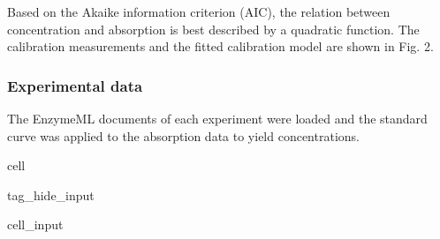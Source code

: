 \documentclass[letterpaper,12pt,english]{jupyterBook}
\begin{document}
\sphinxAtStartPar
Based on the Akaike information criterion (AIC), the relation between concentration and absorption is best described by a quadratic function. The calibration measurements and the fitted calibration model are shown in Fig. 2.


\subsubsection{Experimental data}
\label{\detokenize{scenarios/chymotrypsin_inhibition:experimental-data}}
\sphinxAtStartPar
The EnzymeML documents of each experiment were loaded and the standard curve was applied to the absorption data to yield concentrations.

\begin{sphinxuseclass}{cell}
\begin{sphinxuseclass}{tag_hide_input}\begin{sphinxVerbatimInput}

\begin{sphinxuseclass}{cell_input}
\begin{sphinxVerbatim}[commandchars=\\\{\}]
  
  

   
   
\end{sphinxVerbatim}

\end{sphinxuseclass}\end{sphinxVerbatimInput}

\end{sphinxuseclass}
\end{sphinxuseclass}
\end{document}
